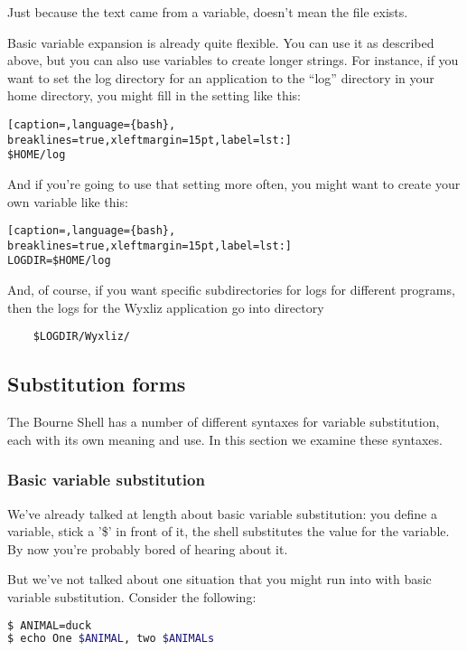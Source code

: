Just because the text came from a variable, doesn't mean the file exists.

Basic variable expansion is already quite flexible. You can use it as described
above, but you can also use variables to create longer strings. For instance,
if you want to set the log directory for an application to the ``log''
directory in your home directory, you might fill in the setting like this:

\lstset{basicstyle=\scriptsize, numbers=left, captionpos=b, tabsize=4}
\begin{lstlisting}[caption=,language={bash},
breaklines=true,xleftmargin=15pt,label=lst:]
$HOME/log
\end{lstlisting}

And if you're going to use that setting more often, you might want to create
your own variable like this:

\lstset{basicstyle=\scriptsize, numbers=left, captionpos=b, tabsize=4}
\begin{lstlisting}[caption=,language={bash},
breaklines=true,xleftmargin=15pt,label=lst:]
LOGDIR=$HOME/log
\end{lstlisting}

And, of course, if you want specific subdirectories for logs for different
programs, then the logs for the Wyxliz application go into directory

\begin{verbatim}
	$LOGDIR/Wyxliz/
\end{verbatim}

\subsection{Substitution forms}
The Bourne Shell has a number of different syntaxes for variable substitution,
each with its own meaning and use. In this section we examine these syntaxes.

\subsubsection{Basic variable substitution}
We've already talked at length about basic variable substitution: you define a
variable, stick a '\$' in front of it, the shell substitutes the value for the
variable. By now you're probably bored of hearing about it.

But we've not talked about one situation that you might run into with basic
variable substitution. Consider the following:
\lstset{basicstyle=\scriptsize, numbers=left, captionpos=b, tabsize=4}
\begin{lstlisting}[caption=Adding some text to a variable's value,language={bash},
breaklines=true,xleftmargin=15pt,label=lst:Adding some text to a variable's value]
$ ANIMAL=duck
$ echo One $ANIMAL, two $ANIMALs
\end{lstlisting}

